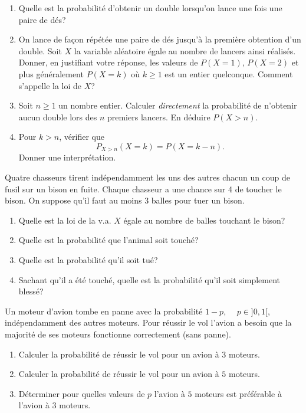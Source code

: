 \documentclass[a4paper,12pt,reqno]{amsart}
\begin{document}
\begin{exo}

  \begin{enumerate}
    \item Quelle est la probabilité d'obtenir un double lorsqu'on lance une fois une paire de dés?
    \item On lance de façon répétée une paire de dés jusqu'à la première obtention d'un double. Soit $X$ la variable aléatoire égale au nombre de lancers ainsi réalisés. Donner, en justifiant votre réponse, les valeurs de $P(X=1)$, $P(X=2)$ et plus généralement $P(X=k)$ où $k\geq 1$ est un entier quelconque. Comment s'appelle la loi de $X$?
    \item Soit $n\geq 1$ un nombre entier. Calculer \emph{directement} la probabilité de n'obtenir aucun double lors des $n$ premiers lancers. En déduire $P(X>n)$.
    \item Pour $k>n$, vérifier que
      $$
        P_{X>n}(X=k)=P(X=k-n).
      $$
    Donner une interprétation.
  \end{enumerate}

\end{exo}

\begin{exo}

  Quatre chasseurs tirent indépendamment les uns des autres  chacun un coup de fusil  sur un bison en fuite. Chaque chasseur a une chance sur 4 de toucher le bison. On suppose qu'il faut au moins 3 balles pour tuer un bison.

  \begin{enumerate}
    \item Quelle est la loi de la v.a. $X$ égale au nombre de balles touchant le bison?
    \item Quelle est la probabilité que l'animal soit touché?
    \item Quelle est la probabilité qu'il soit tué?
    \item Sachant qu'il a été touché, quelle est la probabilité qu'il soit simplement blessé?
  \end{enumerate}

\end{exo}

\begin{exo}

  Un moteur d'avion tombe en panne avec la probabilité $1-p$,~~ $p \in ]0,1[$, indépendamment des autres moteurs. Pour réussir le vol l'avion a besoin que la majorité de ses moteurs fonctionne correctement (sans panne).

  \begin{enumerate}
    \item Calculer la probabilité de réussir le vol pour un avion à $3$ moteurs.
    \item Calculer la probabilité de réussir le vol pour un avion à $5$ moteurs.
    \item Déterminer pour quelles valeurs de $p$ l'avion à $5$ moteurs est préférable à l'avion à $3$ moteurs.
  \end{enumerate}

\end{exo}
\end{document}
